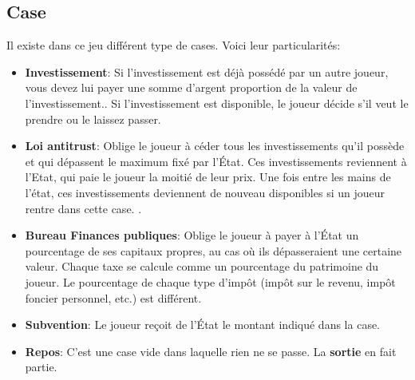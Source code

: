 \documentclass[12pt]{article}
\begin{document}
    \subsection{Case}
        Il existe dans ce jeu différent type de cases. Voici leur particularités:
    \begin{itemize}
        \item \textbf{Investissement}: Si l'investissement est déjà possédé par un autre joueur, vous devez lui payer une somme d'argent proportion de la valeur de l'investissement..
        Si l'investissement est disponible, le joueur décide s'il veut le prendre ou le laissez passer. 
	
        \item \textbf{Loi antitrust}: Oblige le joueur à céder tous les investissements
    qu'il possède et qui dépassent le maximum fixé par l'État. 
    Ces investissements reviennent à l'Etat, qui paie le joueur la moitié de leur prix. 
    Une fois entre les mains de l'état, ces investissements deviennent de nouveau disponibles si un joueur rentre dans cette case. 
    .
        \item  \textbf{Bureau Finances publiques}: Oblige le joueur à payer à l'État un pourcentage de ses
    capitaux propres, au cas où ils dépasseraient une certaine valeur. Chaque taxe se calcule comme un pourcentage du patrimoine du joueur.
    Le pourcentage de chaque type d'impôt (impôt sur le revenu, impôt foncier personnel, etc.) est différent. 
        \item \textbf{Subvention}: Le joueur reçoit de l'État le montant indiqué dans la case.
        \item \textbf{Repos}: C'est une case vide dans laquelle rien ne se passe. La \textbf{sortie} en fait partie.
    \end{itemize}
    
\end{document}
